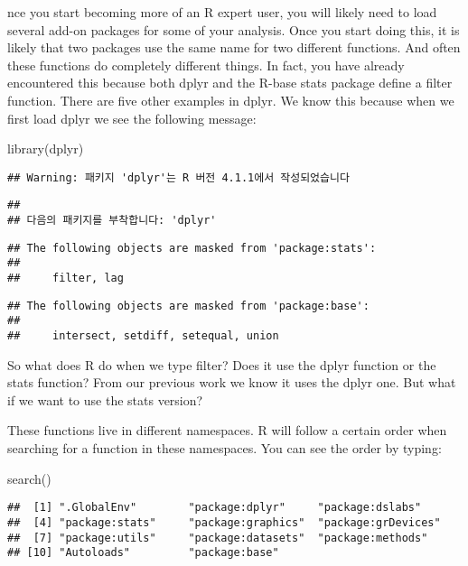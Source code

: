 \documentclass[
]{article}
\newenvironment{Shaded}{\begin{snugshade}}{\end{snugshade}}
\newcommand{\FunctionTok}[1]{\textcolor[rgb]{0.00,0.00,0.00}{#1}}
\newcommand{\NormalTok}[1]{#1}
\begin{document}
nce you start becoming more of an R expert user, you will likely need to
load several add-on packages for some of your analysis. Once you start
doing this, it is likely that two packages use the same name for two
different functions. And often these functions do completely different
things. In fact, you have already encountered this because both dplyr
and the R-base stats package define a filter function. There are five
other examples in dplyr. We know this because when we first load dplyr
we see the following message:

\begin{Shaded}
\begin{Highlighting}[]
\FunctionTok{library}\NormalTok{(dplyr)}
\end{Highlighting}
\end{Shaded}

\begin{verbatim}
## Warning: 패키지 'dplyr'는 R 버전 4.1.1에서 작성되었습니다
\end{verbatim}

\begin{verbatim}
## 
## 다음의 패키지를 부착합니다: 'dplyr'
\end{verbatim}

\begin{verbatim}
## The following objects are masked from 'package:stats':
## 
##     filter, lag
\end{verbatim}

\begin{verbatim}
## The following objects are masked from 'package:base':
## 
##     intersect, setdiff, setequal, union
\end{verbatim}

So what does R do when we type filter? Does it use the dplyr function or
the stats function? From our previous work we know it uses the dplyr
one. But what if we want to use the stats version?

These functions live in different namespaces. R will follow a certain
order when searching for a function in these namespaces. You can see the
order by typing:

\begin{Shaded}
\begin{Highlighting}[]
\FunctionTok{search}\NormalTok{()}
\end{Highlighting}
\end{Shaded}

\begin{verbatim}
##  [1] ".GlobalEnv"        "package:dplyr"     "package:dslabs"   
##  [4] "package:stats"     "package:graphics"  "package:grDevices"
##  [7] "package:utils"     "package:datasets"  "package:methods"  
## [10] "Autoloads"         "package:base"
\end{verbatim}
\end{document}
